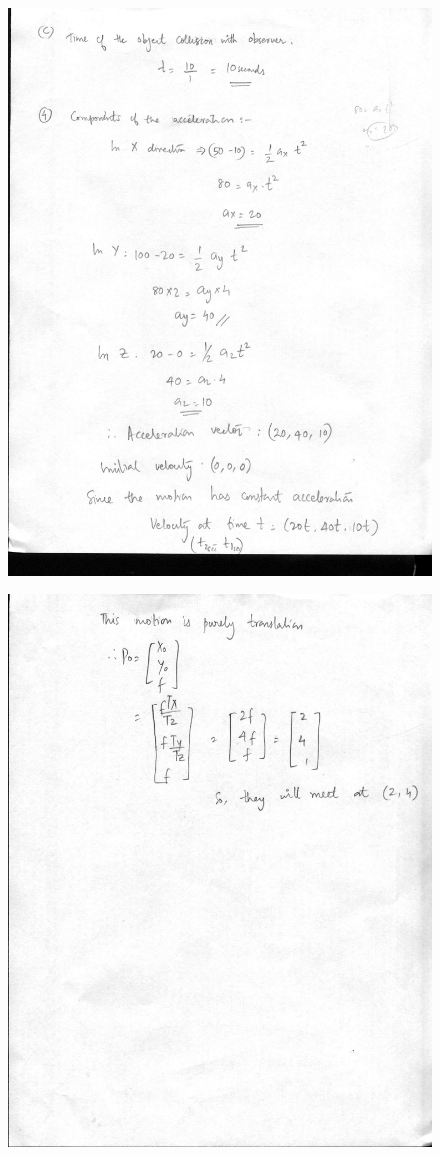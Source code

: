 \documentclass{article}
\begin{document}
\begin{figure}
\includegraphics[width=15cm]{5.jpg}
\end{figure}

\begin{figure}
\includegraphics[width=15cm]{6.jpg}
\end{figure}
\end{document}
